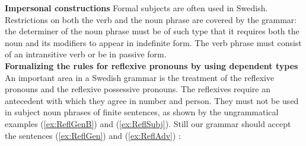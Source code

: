 \documentclass[runningheads,a4paper]{llncs}
\begin{document}
\noindent \textbf{Impersonal constructions}
\label{sec:Formal}
Formal subjects %
are often used in Swedish.
Restrictions on both the verb and the noun phrase are covered by the grammar:
the determiner of the
noun phrase must be of such type that it requires both the noun and its modifiers
to appear in indefinite form. %
The verb phrase must consist of an intransitive verb
or be in passive form.\\

\noindent \textbf{Formalizing the rules for reflexive pronouns by using dependent types}
\label{sec:reflexives}
An important area in a Swedish grammar is the treatment of the reflexive pronouns and
the reflexive possessive pronouns.
The reflexives require an antecedent with which they agree in
number and person. They must 
not be used in subject noun phrases of finite sentences,
as shown by the ungrammatical examples  
(\ref{ex:ReflGenB}) and (\ref{ex:ReflSubj}).
Still our grammar should accept the sentences (\ref{ex:ReflGen})
and (\ref{ex:ReflAdv}) :

\end{document}
